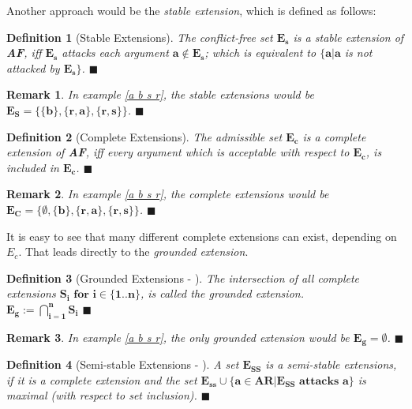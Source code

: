 \documentclass[12pt]{report}
\numberwithin{figure}{chapter}
\theoremstyle{break}
\newtheorem{defn}{Definition}[chapter]
\newtheorem*{rmrk}{Remark}
\newenvironment{mydefn}{\begin{defn}}{$\blacksquare$ \end{defn}}
\newenvironment{myrmrk}{\begin{rmrk}}{$\blacksquare$ \end{rmrk}}
\begin{document}
Another approach would be the \textit{stable extension}, which is defined as follows:

\newpage

\begin{mydefn}[Stable Extensions]
The conflict-free set $\bm{E_{s}}$ is a stable extension of \textbf{AF}, iff $\bm{E_{s}}$ attacks each argument $\bm{a \notin E_{s}}$; which is equivalent to
$\bm{\{a \vert a}$ is not attacked by $\bm{E_{s}\}}$.
\end{mydefn}

\begin{myrmrk}
In example \ref{a b s r}, the stable extensions would be $\bm{E_{S} = \{\{b\},\{r,a\},\{r,s\}\}}$.
\end{myrmrk}

\begin{mydefn}[Complete Extensions]
The admissible set $\bm{E_{c}}$ is a complete extension of \textbf{AF}, iff every argument which is acceptable with respect to $\bm{E_{c}}$, is included in $\bm{E_{c}}$.
\end{mydefn}

\begin{myrmrk}
In example \ref{a b s r}, the complete extensions would be $\bm{E_{C} = \{\emptyset,\{b\},\{r,a\},\{r,s\}\}}$.
\end{myrmrk}

It is easy to see that many different complete extensions can exist, depending on $E_{c}$. That leads directly to the \textit{grounded extension}.

\begin{mydefn}[Grounded Extensions - \cite{Egly}]
The intersection of all complete extensions $\bm{S_{i} \text{ for } i \in \{1..n\}}$, is called the grounded 
extension.\\ $\bm{E_{g} := \bigcap\limits^{n}_{i=1}{S_{i}}}$
\label{ground ext}
\end{mydefn}

\begin{myrmrk}
In example \ref{a b s r}, the only grounded extension would be $\bm{E_{g} = \emptyset}$.
\end{myrmrk}

\begin{mydefn}[Semi-stable Extensions - \cite{Caminada}]
A set $\bm{E_{SS}}$ is a semi-stable extensions, if it is a complete extension and the set $\bm{E_{ss} \cup \{a \in AR \vert E_{SS} \text{ attacks }a\}}$
is maximal (with respect to set inclusion).
\label{semi ext}
\end{mydefn}
\end{document}
